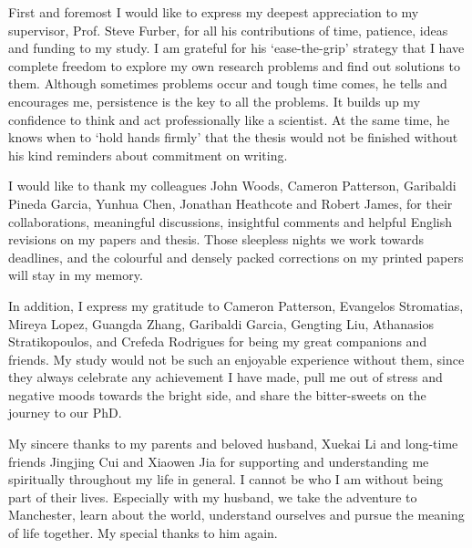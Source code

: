 First and foremost I would like to express my deepest appreciation to my supervisor, Prof. Steve Furber, for all his contributions of time, patience, ideas and funding to my study.
I am grateful for his `ease-the-grip' strategy that I have complete freedom to explore my own research problems and find out solutions to them.
Although sometimes problems occur and tough time comes, he tells and encourages me, persistence is the key to all the problems.
It builds up my confidence to think and act professionally like a scientist.
At the same time, he knows when to `hold hands firmly' that the thesis would not be finished without his kind reminders about commitment on writing.

I would like to thank my colleagues John Woods, Cameron Patterson, Garibaldi Pineda Garcia, Yunhua Chen, Jonathan Heathcote and Robert James, for their collaborations, meaningful discussions, insightful comments and helpful English revisions on my papers and thesis.
Those sleepless nights we work towards deadlines, and the colourful and densely packed corrections on my printed papers will stay in my memory.

In addition, I express my gratitude to Cameron Patterson, Evangelos Stromatias, Mireya Lopez, Guangda Zhang, Garibaldi Garcia, Gengting Liu, Athanasios Stratikopoulos, and Crefeda Rodrigues for being my great companions and friends.
My study would not be such an enjoyable experience without them, since they always celebrate any achievement I have made, pull me out of stress and negative moods towards the bright side, and share the bitter-sweets on the journey to our PhD.

My sincere thanks to my parents and beloved husband, Xuekai Li and long-time friends Jingjing Cui and Xiaowen Jia for supporting and understanding me spiritually throughout my life in general.
I cannot be who I am without being part of their lives.
Especially with my husband, we take the adventure to Manchester, learn about the world, understand ourselves and pursue the meaning of life together.
My special thanks to him again. 
 
 	